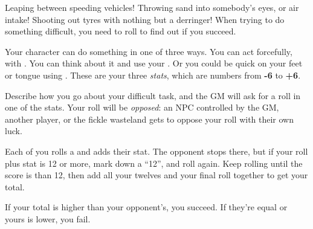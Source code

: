 
Leaping between speeding vehicles! Throwing sand into somebody's eyes, or air intake! Shooting out tyres with nothing but a derringer! When trying to do something difficult, you need to roll to find out if you succeed.

Your character can do something in one of three ways. You can act forcefully, with . You can think about it and use your . Or you could be quick on your feet or tongue using . These are your three \emph{stats}, which are numbers from \textbf{-6} to \textbf{+6}.

Describe how you go about your difficult task, and the GM will ask for a roll in one of the stats. Your roll will be \emph{opposed}: an NPC controlled by the GM, another player, or the fickle wasteland gets to oppose your roll with their own luck.

Each of you rolls a  and adds their stat. The opponent stops there, but if your roll plus stat is 12 or more, mark down a ``12'', and roll again. Keep rolling until the score is than 12, then add all your twelves and your final roll together to get your total.

If your total is higher than your opponent's, you succeed. If they're equal or yours is lower, you fail.
